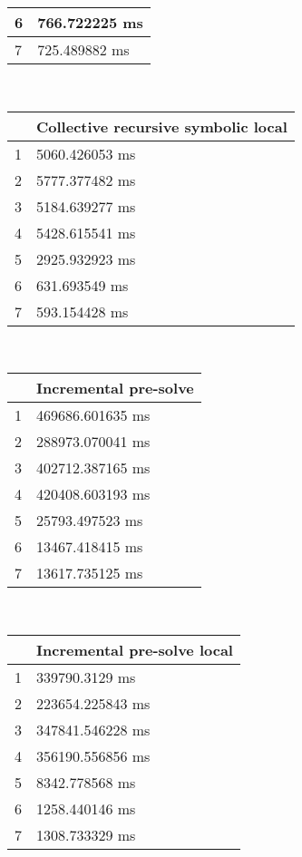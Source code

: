 \begin{multicols}{2}
\begin{tabular}{|l|l|}
		6 & 766.722225 ms \\ \hline
		7 & 725.489882 ms \\ \hline
	\end{tabular}\\
	\begin{tabular}{|l|l|}
		\hline
		& Collective recursive symbolic local \\ \hline
		1 & 5060.426053 ms \\ \hline
		2 & 5777.377482 ms \\ \hline
		3 & 5184.639277 ms \\ \hline
		4 & 5428.615541 ms \\ \hline
		5 & 2925.932923 ms \\ \hline
		6 & 631.693549 ms \\ \hline
		7 & 593.154428 ms \\ \hline
	\end{tabular}\\
	\begin{tabular}{|l|l|}
		\hline
		& Incremental pre-solve \\ \hline
		1 & 469686.601635 ms \\ \hline
		2 & 288973.070041 ms \\ \hline
		3 & 402712.387165 ms \\ \hline
		4 & 420408.603193 ms \\ \hline
		5 & 25793.497523 ms \\ \hline
		6 & 13467.418415 ms \\ \hline
		7 & 13617.735125 ms \\ \hline
	\end{tabular}\\
	\begin{tabular}{|l|l|}
		\hline
		& Incremental pre-solve local \\ \hline
		1 & 339790.3129 ms \\ \hline
		2 & 223654.225843 ms \\ \hline
		3 & 347841.546228 ms \\ \hline
		4 & 356190.556856 ms \\ \hline
		5 & 8342.778568 ms \\ \hline
		6 & 1258.440146 ms \\ \hline
		7 & 1308.733329 ms \\ \hline
	\end{tabular}\\
\end{multicols}\pagebreak
